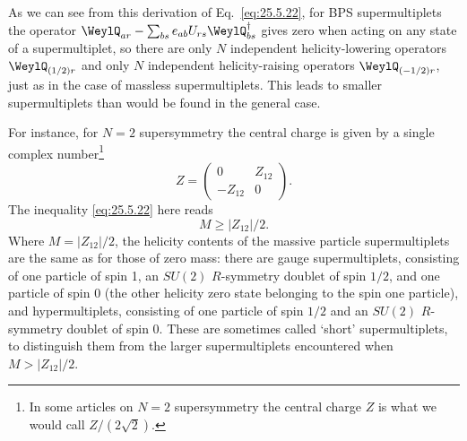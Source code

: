 As we can see from this derivation of Eq.~\eqref{eq:25.5.22}, for BPS
supermultiplets the operator
$\WeylQ_{ar}-\sum_{bs}e_{ab}U_{rs}\WeylQ_{bs}^\dagger$ gives zero when acting
on any state of a supermultiplet, so there are only $N$ independent
helicity-lowering operators $\WeylQ_{(1/2)r}$ and only $N$ independent
helicity-raising operators $\WeylQ_{(-1/2)r}$, just as in the case of massless
supermultiplets. This leads to smaller supermultiplets than would be found in
the general case.

For instance, for $N=2$ supersymmetry the central charge is given by a single
complex number\footnote{In some articles on $N=2$ supersymmetry the central
charge $Z$ is what we would call $Z/(2\sqrt{2})$.}
\begin{equation}
 Z=\begin{pmatrix}0&Z_{12}\\-Z_{12}&0\end{pmatrix}.
\tag{25.5.23}\label{eq:25.5.23}
\end{equation}
The inequality \eqref{eq:25.5.22} here reads
\begin{equation}
 M\geq|Z_{12}|/2.
\tag{25.5.24}\label{eq:25.5.24}
\end{equation}
Where $M=|Z_{12}|/2$, the helicity contents of the massive particle
supermultiplets are the same as for those of zero mass: there are gauge
supermultiplets, consisting of one particle of spin 1, an $SU(2)$
$R$-symmetry doublet of spin $1/2$, and one particle of spin 0 (the other
helicity zero state belonging to the spin one particle), and hypermultiplets,
consisting of one particle of spin $1/2$ and an $SU(2)$ $R$-symmetry doublet
of spin 0. These are sometimes called `short' supermultiplets, to distinguish
them from the larger supermultiplets encountered when $M>|Z_{12}|/2$.

